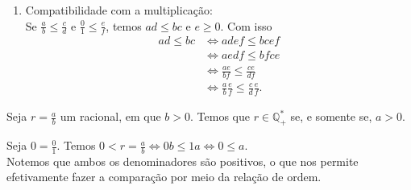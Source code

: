 \documentclass[../main.tex]{subfiles}
\begin{document}
\begin{dem}
\begin{enumerate}[label=(\roman*)]
        \item Compatibilidade com a multiplicação: \\
        Se $\frac{a}{b} \leq \frac{c}{d}$ e $\frac{0}{1} \leq \frac{e}{f}$, temos $ad \leq bc$ e $e \geq 0$. Com isso 
        \begin{align*}
            ad \leq bc 
            &\iff adef \leq bcef \\
            &\iff  aedf \leq bfce \\
            &\iff \frac{ae}{bf} \leq \frac{ce}{df} \\
            &\iff \frac{a}{b} \frac{e}{f} \leq \frac{c}{d} \frac{e}{f}.   
        \end{align*}        
    \end{enumerate}
\end{dem}

\begin{prop}\label{rac-prop-numeradorPositivo}
    Seja $r = \frac{a}{b}$ um racional, em que $b > 0$. Temos que $r \in \mathbb{Q}_{+}^*$ se, e somente se, $a > 0$.
\end{prop}
\begin{dem}
    Seja $0 = \frac{0}{1}$. Temos $0 < r = \frac{a}{b} \iff 0b \leq 1a \iff 0 \leq a$. \\
    Notemos que ambos os denominadores são positivos, o que nos permite efetivamente fazer a comparação por meio da relação de ordem.
\end{dem}
\end{document}
